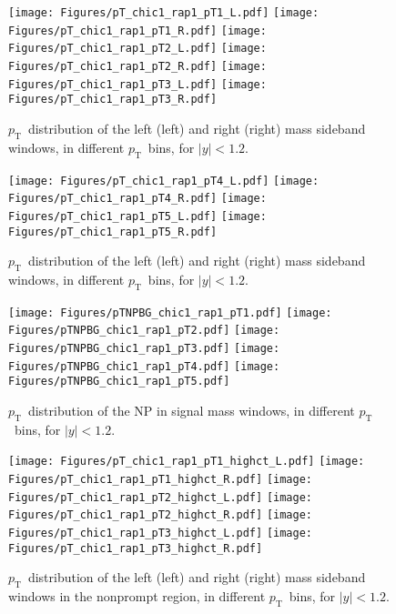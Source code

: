 \documentclass[12pt]{article}
\newcommand{\pt}{$p_{\mathrm{T}}$}
\begin{document}
\begin{figure}[htbp]
\centering
\texttt{[image: Figures/pT\_chic1\_rap1\_pT1\_L.pdf]}
\texttt{[image: Figures/pT\_chic1\_rap1\_pT1\_R.pdf]}
\texttt{[image: Figures/pT\_chic1\_rap1\_pT2\_L.pdf]}
\texttt{[image: Figures/pT\_chic1\_rap1\_pT2\_R.pdf]}
\texttt{[image: Figures/pT\_chic1\_rap1\_pT3\_L.pdf]}
\texttt{[image: Figures/pT\_chic1\_rap1\_pT3\_R.pdf]}
\caption{\pt\ distribution of the left (left) and
  right (right) mass sideband windows, in different
  \pt\ bins, for $|y| < 1.2$.}
\end{figure}
\clearpage

\begin{figure}[htbp]
\centering
\texttt{[image: Figures/pT\_chic1\_rap1\_pT4\_L.pdf]}
\texttt{[image: Figures/pT\_chic1\_rap1\_pT4\_R.pdf]}
\texttt{[image: Figures/pT\_chic1\_rap1\_pT5\_L.pdf]}
\texttt{[image: Figures/pT\_chic1\_rap1\_pT5\_R.pdf]}
\caption{\pt\ distribution of the left (left) and
  right (right) mass sideband windows, in different
  \pt\ bins, for $|y| < 1.2$.}
\end{figure}
\clearpage

\begin{figure}[htbp]
\centering
\texttt{[image: Figures/pTNPBG\_chic1\_rap1\_pT1.pdf]}
\texttt{[image: Figures/pTNPBG\_chic1\_rap1\_pT2.pdf]}
\texttt{[image: Figures/pTNPBG\_chic1\_rap1\_pT3.pdf]}
\texttt{[image: Figures/pTNPBG\_chic1\_rap1\_pT4.pdf]}
\texttt{[image: Figures/pTNPBG\_chic1\_rap1\_pT5.pdf]}
\caption{\pt\ distribution of the NP in signal mass
  windows, in different \pt\ bins, for $|y| < 1.2$.}
\end{figure}
\clearpage

\begin{figure}[htbp]
\centering
\texttt{[image: Figures/pT\_chic1\_rap1\_pT1\_highct\_L.pdf]}
\texttt{[image: Figures/pT\_chic1\_rap1\_pT1\_highct\_R.pdf]}
\texttt{[image: Figures/pT\_chic1\_rap1\_pT2\_highct\_L.pdf]}
\texttt{[image: Figures/pT\_chic1\_rap1\_pT2\_highct\_R.pdf]}
\texttt{[image: Figures/pT\_chic1\_rap1\_pT3\_highct\_L.pdf]}
\texttt{[image: Figures/pT\_chic1\_rap1\_pT3\_highct\_R.pdf]}
\caption{\pt\ distribution of the left (left) and
  right (right) mass sideband windows in the nonprompt region, in
  different
  \pt\ bins, for $|y| < 1.2$.}
\end{figure}
\clearpage
\end{document}
